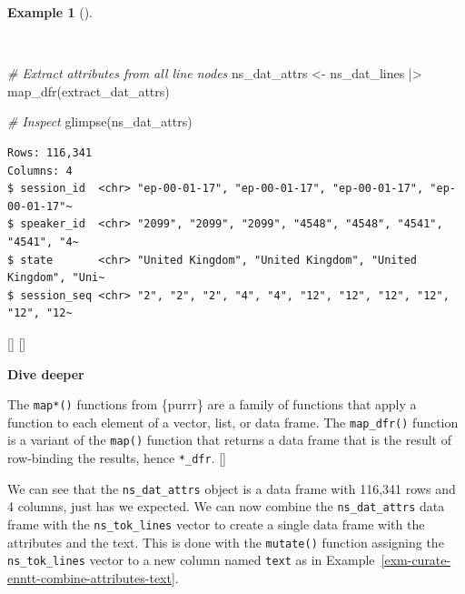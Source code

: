 \documentclass[
  letterpaper,
  krantz1]{latex/krantz-mod}
\newenvironment{Shaded}{\begin{snugshade}}{\end{snugshade}}
\newcommand{\CommentTok}[1]{\textcolor[rgb]{0.00,0.00,0.00}{\textit{#1}}}
\newcommand{\FunctionTok}[1]{\textcolor[rgb]{0.00,0.00,0.00}{#1}}
\newcommand{\NormalTok}[1]{\textcolor[rgb]{0.00,0.00,0.00}{#1}}
\newcommand{\OtherTok}[1]{\textcolor[rgb]{0.00,0.00,0.00}{#1}}
\newcommand{\SpecialCharTok}[1]{\textcolor[rgb]{0.00,0.00,0.00}{#1}}
\newcommand{\cindex}[1]{%
  \StrSubstitute{#1}{_}{\_}[\temp]%
  \index{\temp}%
}
\theoremstyle{definition}
\theoremstyle{definition}
\newtheorem{example}{Example}[chapter]
\theoremstyle{remark}
\begin{document}
\begin{example}[]\protect\hypertarget{exm-curate-enntt-extract-attributes-all}{}\label{exm-curate-enntt-extract-attributes-all}

~

\begin{Shaded}
\begin{Highlighting}[numbers=left,,]
\CommentTok{\# Extract attributes from all line nodes}
\NormalTok{ns\_dat\_attrs }\OtherTok{\textless{}{-}}
\NormalTok{  ns\_dat\_lines }\SpecialCharTok{|\textgreater{}}
  \FunctionTok{map\_dfr}\NormalTok{(extract\_dat\_attrs)}

\CommentTok{\# Inspect}
\FunctionTok{glimpse}\NormalTok{(ns\_dat\_attrs)}
\end{Highlighting}
\end{Shaded}

\begin{verbatim}
Rows: 116,341
Columns: 4
$ session_id  <chr> "ep-00-01-17", "ep-00-01-17", "ep-00-01-17", "ep-00-01-17"~
$ speaker_id  <chr> "2099", "2099", "2099", "4548", "4548", "4541", "4541", "4~
$ state       <chr> "United Kingdom", "United Kingdom", "United Kingdom", "Uni~
$ session_seq <chr> "2", "2", "2", "4", "4", "12", "12", "12", "12", "12", "12~
\end{verbatim}

\cindex{map_dfr()}\cindex{glimpse()}

\end{example}

\begin{tcolorbox}[enhanced jigsaw, toprule=.15mm, breakable, colback=white, arc=.35mm, left=2mm, colframe=quarto-callout-color-frame, opacityback=0, bottomrule=.15mm, rightrule=.15mm, leftrule=.75mm]

\textbf{ Dive deeper}

The \texttt{map*()} functions from \{purrr\} are a family of functions
that apply a function to each element of a vector, list, or data frame.
The \texttt{map\_dfr()} function is a variant of the \texttt{map()}
function that returns a data frame that is the result of row-binding the
results, hence \texttt{*\_dfr}.\cindex{map_dfr()}

\end{tcolorbox}

We can see that the \texttt{ns\_dat\_attrs} object is a data frame with
116,341 rows and 4 columns, just has we expected. We can now combine the
\texttt{ns\_dat\_attrs} data frame with the \texttt{ns\_tok\_lines}
vector to create a single data frame with the attributes and the text.
This is done with the \texttt{mutate()} function assigning the
\texttt{ns\_tok\_lines} vector to a new column named \texttt{text} as in
Example~\ref{exm-curate-enntt-combine-attributes-text}.
\end{document}
